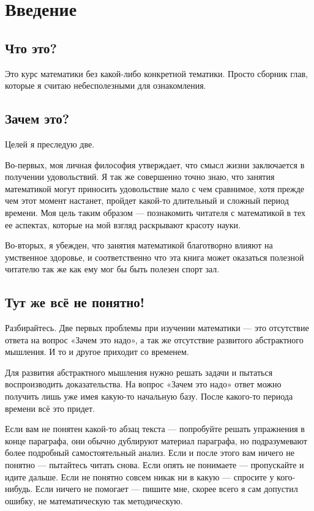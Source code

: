 \chapter*{Введение}

\section*{Что это?}
Это курс математики без какой-либо конкретной тематики. Просто сборник глав, которые я считаю небесполезными для ознакомления.

\section*{Зачем это?}
Целей я преследую две.

Во-первых, моя личная философия утверждает, что смысл жизни заключается в получении удовольствий. Я так же совершенно точно знаю, что занятия математикой могут приносить удовольствие мало с чем сравнимое, хотя прежде чем этот момент настанет, пройдет какой-то длительный и сложный период времени. Моя цель таким образом --- познакомить читателя с математикой в тех ее аспектах, которые на мой взгляд раскрывают красоту науки.

Во-вторых, я убежден, что занятия математикой благотворно влияют на умственное здоровье, и соответственно что эта книга может оказаться полезной читателю так же как ему мог бы быть полезен спорт зал.

\section*{Тут же всё не понятно!}
Разбирайтесь. Две первых проблемы при изучении математики --- это отсутствие ответа на вопрос «Зачем это надо», а так же отсутствие развитого абстрактного мышления. И то и другое приходит со временем.

Для развития абстрактного мышления нужно решать задачи и пытаться воспроизводить доказательства. На вопрос «Зачем это надо» ответ можно получить лишь уже имея какую-то начальную базу. После какого-то периода времени всё это придет.

Если вам не понятен какой-то абзац текста --- попробуйте решать упражнения в конце параграфа, они обычно дублируют материал параграфа, но подразумевают более подробный самостоятельный анализ. Если и после этого вам ничего не понятно --- пытайтесь читать снова. Если опять не понимаете --- пропускайте и идите дальше. Если не понятно совсем никак ни в какую --- спросите у кого-нибудь. Если ничего не помогает --- пишите мне, скорее всего я сам допустил ошибку, не математическую так методическую.

